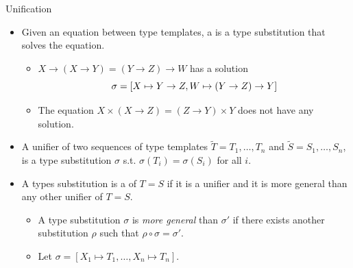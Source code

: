 \documentclass[paper=screen,mode=present,style=zysimple]{powerdot}
\begin{document}
\begin{slide}{Unification}
\begin{itemize}
\item Given an equation between type templates, a  is a type substitution
  that solves the equation. 
\begin{itemize}\small
\item $X \to (X \to Y) = (Y \to Z) \to W$ has a solution 
\[
\sigma = [ X \mapsto Y \to Z, W \mapsto (Y \to Z) \to Y ]
\vspace*{-1.5em}
\]
\item The equation $X \times (X \to Z) = (Z \to Y) \times Y$ does not have any solution.
\end{itemize}
\item A unifier of two sequences of type templates $\tilde{T} = T_1, \ldots , T_n$ and 
  $\tilde S = S_1, \ldots , S_n$, is a type substitution $\sigma$ s.t. 
  $\sigma(T_i) = \sigma(S_i)$ for all $i$.
\item A types substitution is a  of $T = S$ if it is a unifier 
and it is more general than any other unifier of $T =S$. \\
\begin{itemize} \small
\item A type substitution $\sigma$ is {\em more general} than $\sigma'$ if there exists another 
substitution $\rho$ such that $\rho \circ \sigma = \sigma'$.
\item Let $\sigma = [X_1 \mapsto T_1, \ldots , X_n \mapsto T_n]$. 
\end{itemize}
\end{itemize}
\end{slide}
\end{document}
